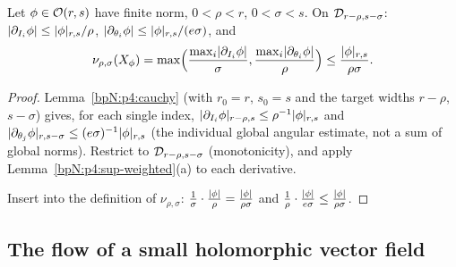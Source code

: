 \begin{lemma}\label{bpN:p5:vf-bound}
Let $\phi\in\mathcal O(r,s)$ have finite norm, $0<\rho<r$, $0<\sigma<s$. On $\mathcal D_{r-\rho,s-\sigma}$:
$\lvert \partial_{I_i}\phi\rvert\le\lvert \phi\rvert_{r,s}/\rho$, $\lvert \partial_{\theta_i}\phi\rvert\le\lvert \phi\rvert_{r,s}/(e\sigma)$, and
\[\nu_{\rho,\sigma}(X_\phi)=\max\Bigl(\frac{\max_i\lvert \partial_{I_i}\phi\rvert}{\sigma},\frac{\max_i\lvert \partial_{\theta_i}\phi\rvert}{\rho}\Bigr)\le\frac{\lvert \phi\rvert_{r,s}}{\rho\sigma}.\]
\end{lemma}
\begin{proof}
\label{stepN:p5:vf-deriv} Lemma~\ref{bpN:p4:cauchy} (with $r_0=r$, $s_0=s$ and the target widths $r-\rho$, $s-\sigma$) gives, for each single index, $\lvert \partial_{I_i}\phi\rvert_{r-\rho,s}\le\rho^{-1}\lvert \phi\rvert_{r,s}$ and $\lvert \partial_{\theta_j}\phi\rvert_{r,s-\sigma}\le(e\sigma)^{-1}\lvert \phi\rvert_{r,s}$ (the individual global angular estimate, not a sum of global norms).
Restrict to $\mathcal D_{r-\rho,s-\sigma}$ (monotonicity), and apply Lemma~\ref{bpN:p4:sup-weighted}(a) to each derivative.

\label{stepN:p5:vf-field} Insert into the definition of $\nu_{\rho,\sigma}$: $\frac1\sigma\cdot\frac{\lvert \phi\rvert}\rho=\frac{\lvert \phi\rvert}{\rho\sigma}$ and $\frac1\rho\cdot\frac{\lvert \phi\rvert}{e\sigma}\le\frac{\lvert \phi\rvert}{\rho\sigma}$.
\end{proof}

\subsection{The flow of a small holomorphic vector field}\label{bpN:p5:s-flow}

